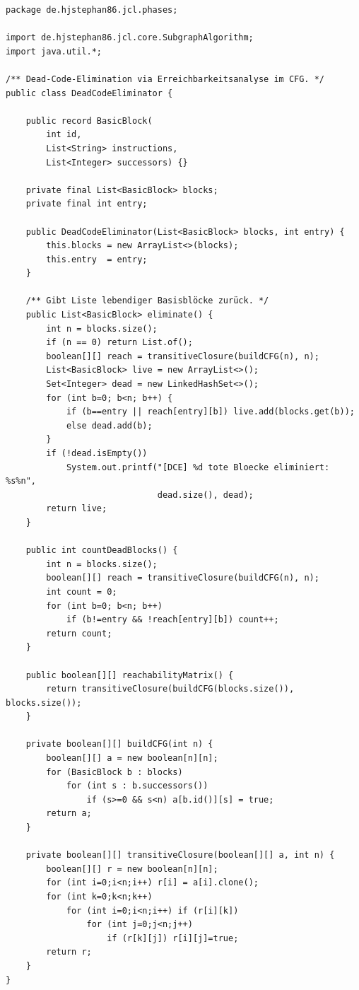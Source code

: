 ﻿\documentclass[a4paper,12pt]{article}
\theoremstyle{definition}
\begin{document}
\begin{lstlisting}[style=javastyle,
    caption={DeadCodeEliminator.java -- DCE via SI}]
package de.hjstephan86.jcl.phases;

import de.hjstephan86.jcl.core.SubgraphAlgorithm;
import java.util.*;

/** Dead-Code-Elimination via Erreichbarkeitsanalyse im CFG. */
public class DeadCodeEliminator {

    public record BasicBlock(
        int id,
        List<String> instructions,
        List<Integer> successors) {}

    private final List<BasicBlock> blocks;
    private final int entry;

    public DeadCodeEliminator(List<BasicBlock> blocks, int entry) {
        this.blocks = new ArrayList<>(blocks);
        this.entry  = entry;
    }

    /** Gibt Liste lebendiger Basisblöcke zurück. */
    public List<BasicBlock> eliminate() {
        int n = blocks.size();
        if (n == 0) return List.of();
        boolean[][] reach = transitiveClosure(buildCFG(n), n);
        List<BasicBlock> live = new ArrayList<>();
        Set<Integer> dead = new LinkedHashSet<>();
        for (int b=0; b<n; b++) {
            if (b==entry || reach[entry][b]) live.add(blocks.get(b));
            else dead.add(b);
        }
        if (!dead.isEmpty())
            System.out.printf("[DCE] %d tote Bloecke eliminiert: %s%n",
                              dead.size(), dead);
        return live;
    }

    public int countDeadBlocks() {
        int n = blocks.size();
        boolean[][] reach = transitiveClosure(buildCFG(n), n);
        int count = 0;
        for (int b=0; b<n; b++)
            if (b!=entry && !reach[entry][b]) count++;
        return count;
    }

    public boolean[][] reachabilityMatrix() {
        return transitiveClosure(buildCFG(blocks.size()), blocks.size());
    }

    private boolean[][] buildCFG(int n) {
        boolean[][] a = new boolean[n][n];
        for (BasicBlock b : blocks)
            for (int s : b.successors())
                if (s>=0 && s<n) a[b.id()][s] = true;
        return a;
    }

    private boolean[][] transitiveClosure(boolean[][] a, int n) {
        boolean[][] r = new boolean[n][n];
        for (int i=0;i<n;i++) r[i] = a[i].clone();
        for (int k=0;k<n;k++)
            for (int i=0;i<n;i++) if (r[i][k])
                for (int j=0;j<n;j++)
                    if (r[k][j]) r[i][j]=true;
        return r;
    }
}
\end{lstlisting}
\end{document}
